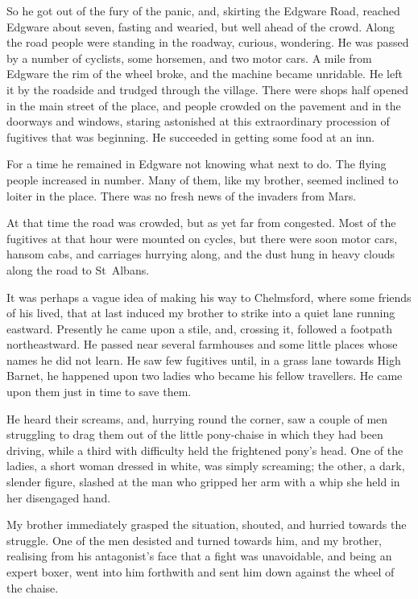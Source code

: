 So he got out of the fury of the panic, and, skirting the Edgware Road, reached Edgware about seven, fasting and wearied, but well ahead of the crowd. Along the road people were standing in the roadway, curious, wondering. He was passed by a number of cyclists, some horsemen, and two motor cars. A mile from Edgware the rim of the wheel broke, and the machine became unridable. He left it by the roadside and trudged through the village. There were shops half opened in the main street of the place, and people crowded on the pavement and in the doorways and windows, staring astonished at this extraordinary procession of fugitives that was beginning. He succeeded in getting some food at an inn. \label{broexp2a}

For a time he remained in Edgware not knowing what next to do. The flying people increased in number. Many of them, like my brother, seemed inclined to loiter in the place. There was no fresh news of the invaders from Mars.

At that time the road was crowded, but as yet far from congested. Most of the fugitives at that hour were mounted on cycles, but there were soon motor cars, hansom cabs, and carriages hurrying along, and the dust hung in heavy clouds along the road to St~Albans.

It was perhaps a vague idea of making his way to Chelmsford, where some friends of his lived, \label{broexp4a} that at last induced my brother to strike into a quiet lane running eastward. Presently he came upon a stile, and, crossing it, followed a footpath northeastward. He passed near several farmhouses and some little places whose names he did not learn. He saw few fugitives until, in a grass lane towards High Barnet, he happened upon two ladies who became his fellow travellers. He came upon them just in time to save them.

He heard their screams, and, hurrying round the corner, saw a couple of men struggling to drag them out of the little pony-chaise in which they had been driving, while a third with difficulty held the frightened pony's head. One of the ladies, a short woman dressed in white, was simply screaming; the other, a dark, slender figure, slashed at the man who gripped her arm with a whip she held in her disengaged hand.

My brother immediately grasped the situation, shouted, and hurried towards the struggle. One of the men desisted and turned towards him, and my brother, realising from his antagonist's face that a fight was unavoidable, and being an expert boxer, went into him forthwith and sent him down against the wheel of the chaise.

